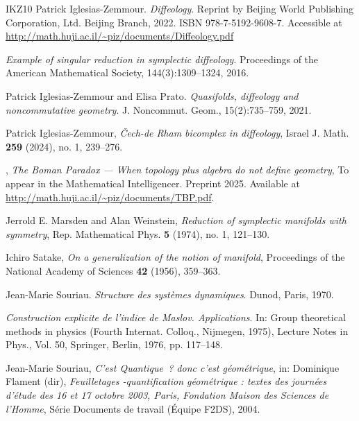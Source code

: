 \documentclass[11pt,reqno,letterpaper,twoside]{amsart}
\begin{document}
\begin{thebibliography}{IKZ10}
    Patrick Iglesias-Zemmour.
    {\em Diffeology}.
    Reprint by Beijing World Publishing Corporation, Ltd. Beijing Branch, 2022. ISBN 978-7-5192-9608-7.
    Accessible at \\
    \url{http://math.huji.ac.il/~piz/documents/Diffeology.pdf}
    
    \bysame
    {\em Example of singular reduction in symplectic diffeology}.
    Proceedings of the American Mathematical Society, 144(3):1309--1324, 2016.
    
    Patrick Iglesias-Zemmour and Elisa Prato.
    {\em Quasifolds, diffeology and noncommutative geometry}.
    J. Noncommut. Geom., 15(2):735--759, 2021.
    
    Patrick Iglesias-Zemmour,
    \emph{{\v C}ech-de Rham bicomplex in diffeology},
    Israel J. Math. \textbf{259} (2024), no. 1, 239--276.
    
    \bysame,
    \emph{The Boman Paradox --- When topology plus algebra do not define geometry},
    To appear in the Mathematical Intelligencer. Preprint 2025. Available at \url{http://math.huji.ac.il/~piz/documents/TBP.pdf}.
    
    Jerrold E. Marsden and Alan Weinstein,
    \emph{Reduction of symplectic manifolds with symmetry},
    Rep. Mathematical Phys. \textbf{5} (1974), no. 1, 121--130.
    
    Ichiro Satake,
    \emph{On a generalization of the notion of manifold},
    Proceedings of the National Academy of Sciences \textbf{42} (1956), 359--363.
    
    Jean-Marie Souriau.
    {\em Structure des syst\`emes dynamiques}.
    Dunod, Paris, 1970.
    
    \bysame %
    \newblock \emph{Construction explicite de l'indice de Maslov. Applications}.
    \newblock In: Group theoretical methods in physics (Fourth Internat. Colloq., Nijmegen, 1975), Lecture Notes in Phys., Vol. 50, Springer, Berlin, 1976, pp. 117--148.
    
    Jean-Marie Souriau,
    \emph{C’est Quantique~? donc c’est géométrique},
    in: Dominique Flament (dir),
    \emph{Feuilletages -quantification géométrique : textes des journées d’étude des 16 et 17 octobre 2003, Paris, Fondation Maison des Sciences de l’Homme},
    Série Documents de travail (Équipe F2DS), 2004.
    
  \end{thebibliography}
  
  
\end{document}
